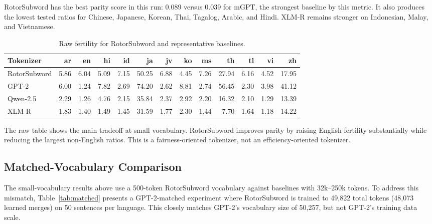 \documentclass[11pt]{article}
\begin{document}
RotorSubword has the best parity score in this run: 0.089 versus 0.039 for mGPT, the strongest baseline by this metric. It also produces the lowest tested ratios for Chinese, Japanese, Korean, Thai, Tagalog, Arabic, and Hindi. XLM-R remains stronger on Indonesian, Malay, and Vietnamese.

\begin{table}[htbp]
\centering
\small
\caption{Raw fertility for RotorSubword and representative baselines.}
\label{tab:fertility}
\begin{tabular}{lrrrrrrrrrrrr}
\toprule
Tokenizer & ar & en & hi & id & ja & jv & ko & ms & th & tl & vi & zh \\
\midrule
RotorSubword & 5.86 & 6.04 & 5.09 & 7.15 & 50.25 & 6.88 & 4.45 & 7.26 & 27.94 & 6.16 & 4.52 & 17.95 \\
GPT-2 & 6.00 & 1.24 & 7.82 & 2.69 & 74.20 & 2.62 & 8.81 & 2.74 & 56.45 & 2.30 & 3.98 & 41.12 \\
Qwen-2.5 & 2.29 & 1.26 & 4.76 & 2.15 & 35.84 & 2.37 & 2.92 & 2.20 & 16.32 & 2.10 & 1.29 & 13.39 \\
XLM-R & 1.83 & 1.40 & 1.49 & 1.45 & 31.59 & 1.77 & 2.30 & 1.44 & 7.70 & 1.64 & 1.18 & 14.22 \\
\bottomrule
\end{tabular}
\end{table}

The raw table shows the main tradeoff at small vocabulary. RotorSubword improves parity by raising English fertility substantially while reducing the largest non-English ratios. This is a fairness-oriented tokenizer, not an efficiency-oriented tokenizer.

\subsection{Matched-Vocabulary Comparison}

The small-vocabulary results above use a 500-token RotorSubword vocabulary against baselines with 32k--250k tokens. To address this mismatch, Table~\ref{tab:matched} presents a GPT-2-matched experiment where RotorSubword is trained to 49,822 total tokens (48,073 learned merges) on 50 sentences per language. This closely matches GPT-2's vocabulary size of 50,257, but not GPT-2's training data scale.
\end{document}

